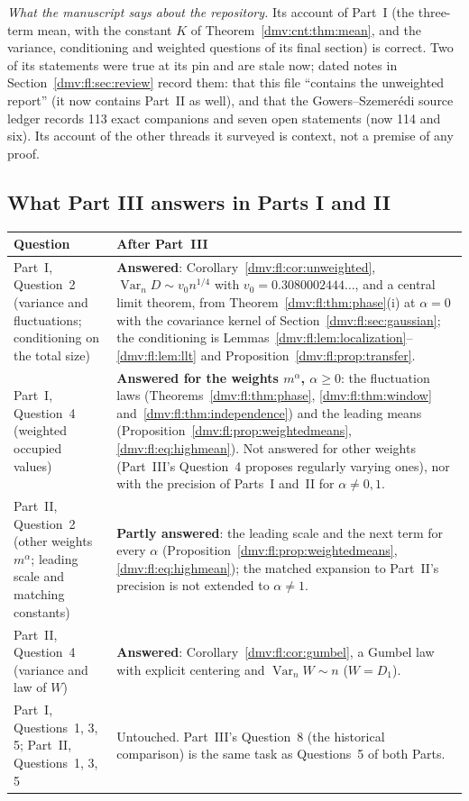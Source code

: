 \documentclass[11pt,letterpaper]{article}
\numberwithin{equation}{section}
\theoremstyle{definition}\newtheorem{definition}[theorem]{Definition}
\theoremstyle{remark}\newtheorem{remark}[theorem]{Remark}
\DeclareMathOperator{\Var}{Var}
\begin{document}
\emph{What the manuscript says about the repository.} Its account of
Part~I (the three-term mean, with the constant $K$ of
Theorem~\ref{dmv:cnt:thm:mean}, and the variance, conditioning and
weighted questions of its final section) is correct. Two of its
statements were true at its pin and are stale now; dated notes in
Section~\ref{dmv:fl:sec:review} record them: that this file ``contains the
unweighted report'' (it now contains Part~II as well), and that the
Gowers--Szemer\'edi source ledger records 113 exact companions and seven
open statements (now 114 and six). Its account of the other threads it
surveyed is context, not a premise of any proof.

\subsection{What Part III answers in Parts I and II}\label{dmv:fl:sec:answers}

\begingroup\small
\renewcommand{\arraystretch}{1.12}
\renewcommand{\theHtable}{dmvfl.answers}%
\begin{longtable}{@{}>{\raggedright\arraybackslash}p{}>{\raggedright\arraybackslash}p{}@{}}
\toprule
Question & After Part~III\\
\midrule
\endhead
Part~I, Question~2 (variance and fluctuations; conditioning on the total size) & \textbf{Answered}: Corollary~\ref{dmv:fl:cor:unweighted}, $\Var_nD\sim v_0n^{1/4}$ with $v_0=0.3080002444\ldots$, and a central limit theorem, from Theorem~\ref{dmv:fl:thm:phase}(i) at $\alpha=0$ with the covariance kernel of Section~\ref{dmv:fl:sec:gaussian}; the conditioning is Lemmas~\ref{dmv:fl:lem:localization}--\ref{dmv:fl:lem:llt} and Proposition~\ref{dmv:fl:prop:transfer}.\\
Part~I, Question~4 (weighted occupied values) & \textbf{Answered for the weights $m^\alpha$, $\alpha\ge0$}: the fluctuation laws (Theorems~\ref{dmv:fl:thm:phase}, \ref{dmv:fl:thm:window} and~\ref{dmv:fl:thm:independence}) and the leading means (Proposition~\ref{dmv:fl:prop:weightedmeans}, \eqref{dmv:fl:eq:highmean}). Not answered for other weights (Part~III's Question~4 proposes regularly varying ones), nor with the precision of Parts~I and~II for $\alpha\ne0,1$.\\
Part~II, Question~2 (other weights $m^\alpha$; leading scale and matching constants) & \textbf{Partly answered}: the leading scale and the next term for every $\alpha$ (Proposition~\ref{dmv:fl:prop:weightedmeans}, \eqref{dmv:fl:eq:highmean}); the matched expansion to Part~II's precision is not extended to $\alpha\ne1$.\\
Part~II, Question~4 (variance and law of $W$) & \textbf{Answered}: Corollary~\ref{dmv:fl:cor:gumbel}, a Gumbel law with explicit centering and $\Var_nW\sim n$ ($W=D_1$).\\
Part~I, Questions~1, 3, 5; Part~II, Questions~1, 3, 5 & Untouched. Part~III's Question~8 (the historical comparison) is the same task as Questions~5 of both Parts.\\
\bottomrule
\end{longtable}
\addtocounter{table}{-1}%
\endgroup
\end{document}
